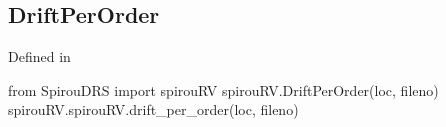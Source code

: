 \begin{minipage}{\textwidth}
\subsection{DriftPerOrder}

Defined in \spirouRV{}

\begin{pythonbox}
from SpirouDRS import spirouRV
spirouRV.DriftPerOrder(loc, fileno)
spirouRV.spirouRV.drift_per_order(loc, fileno)
\end{pythonbox}

\begin{pythondocstring}

\end{pythondocstring}
\end{minipage}

